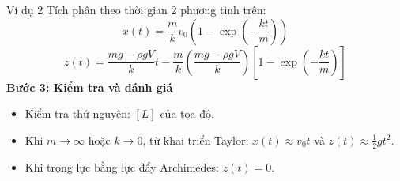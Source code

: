 \begin{frame}{Ví dụ 2}
Tích phân theo thời gian 2 phương tình trên:
\begin{equation*}
    x(t) = \dfrac{m}{k}v_0\left(1 - \exp\left(-\dfrac{kt}{m}\right)\right)
\end{equation*}
\begin{equation*}
    z(t) = \dfrac{mg - \rho g V}{k}t - \dfrac{m}{k}\left(\dfrac{mg - \rho g V}{k}\right)\left[1 - \exp\left(-\dfrac{kt}{m}\right)\right]
\end{equation*}
\textbf{Bước 3: Kiểm tra và đánh giá}
\begin{itemize}
    \item Kiểm tra thứ nguyên: \([L]\) của tọa độ.
    \item Khi \(m\to\infty\) hoặc \(k\to 0\), từ khai triển Taylor: \(x(t)\approx v_0 t\) và \(z(t)\approx \frac12 g t^2\).
    \item Khi trọng lực bằng lực đẩy Archimedes: \(z(t)=0\).
\end{itemize}
\end{frame}